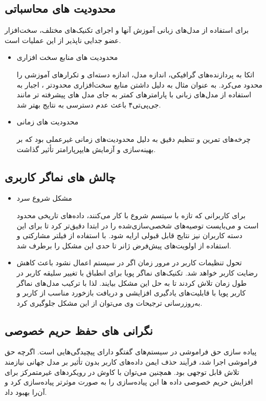 \subsection{محدودیت های محاسباتی}
برای استفاده از مدل‌های زبانی آموزش آنها و اجرای تکنیک‌های مختلف، سخت‌افزار عضو جدایی ناپذیر از این عملیات است. 

\begin{itemize}
\item
محدودیت های منابع سخت افزاری

 اتکا به پردازنده‌های گرافیکی، اندازه مدل، اندازه دسته‌ای و تکرارهای آموزشی را محدود می‌کرد. به عنوان مثال به دلیل داشتن منابع سخت‌افزاری محدودتر ، اجبار به استفاده از مدل‌های زبانی با پارامترهای کمتر به جای مدل های پیشرفته تر مانند جی‌پی‌تی۴ باعث عدم دسترسی به نتایج بهتر شد.

\item
 محدودیت های زمانی

 چرخه‌های تمرین و تنظیم دقیق به دلیل محدودیت‌های زمانی غیرعملی بود که بر بهینه‌سازی و آزمایش هایپرپارامتر تأثیر گذاشت.
\end{itemize}


\subsection{چالش های نماگر کاربری}
\begin{itemize}
\item
مشکل شروع سرد

برای کاربرانی که تازه با سیتسم شروع با کار می‌کنند، داده‌های تاریخی محدود است و می‌بایست توصیه‌های شخصی‌سازی‌شده را در ابتدا دقیق‌تر کرد تا برای این دسته کاربران نیز نتایج قابل قبولی ارایه شود. با استفاده از فیلتر مشارکتی و استفاده از اولویت‌های پیش‌فرض ژانر تا حدی این مشکل را برطرف شد.

\item
تحول تنظیمات کاربر در مرور زمان اگر در سیستم اعمال نشود باعث کاهش رضایت کاربر خواهد شد. تکنیک‌های نماگر پویا برای انطباق با تغییر سلیقه کاربر در طول زمان تلاش کردند تا به حل این مشکل بیایند. لذا با ترکیب مدل‌های نماگر کاربر پویا با قابلیت‌های یادگیری افزایشی و دریافت بازخورد مناسب از کاربر و به‌روزرسانی ترجیحات وی می‌توان از این مشکل جلوگیری کرد.
\end{itemize}

\subsection{نگرانی های حفظ حریم خصوصی}
پیاده سازی حق فراموشی در سیستم‌‌های گفتگو دارای پیچیدگی‌هایی است. اگرچه حق فراموشی اجرا شد، فرآیند حذف ایمن داده‌های کاربر بدون تأثیر بر مدل جهانی نیازمند تلاش قابل توجهی بود. همچنین می‌توان با کاوش در رویکردهای غیرمتمرکز برای افزایش حریم خصوصی داده ها این پیاده‌سازی را به صورت موثرتر پیاده‌سازی کرد و آن‌را بهبود داد.


